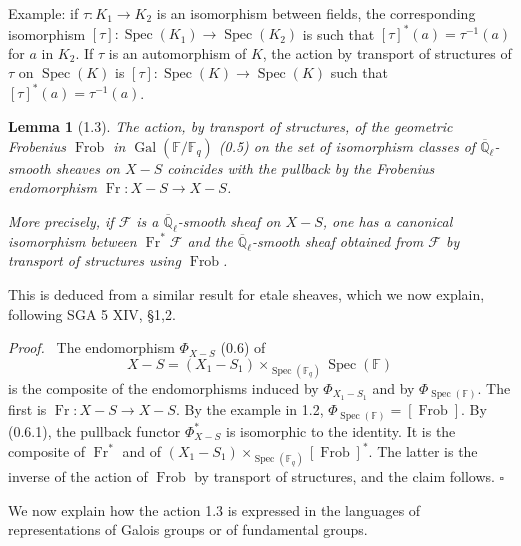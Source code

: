 \documentclass[10pt]{article}
\newcommand{\Fq}{\mathbb F_q}
\newcommand{\Fb}{\mathbb F}
\newcommand{\Ql}{\overline{\mathbb Q}_{\ell}}
\newcommand{\Gal}{\operatorname{Gal}}
\newcommand{\Spec}{\operatorname{Spec}}
\newcommand{\Fr}{\operatorname{Fr}}
\newcommand{\Frob}{\operatorname{Frob}}
\theoremstyle{deligne}
\newtheorem*{lemma*}{Lemma}
\newenvironment{proofdel}[1][Proof.]{\textit{#1}\ }{\hfill$\square$}
\newcommand{\heading}[1]{\vspace{0.7em}\noindent{\bfseries #1}\quad}
\begin{document}
Example: if $\tau:K_1\to K_2$ is an isomorphism between fields, the corresponding isomorphism $[\tau]:\Spec(K_1)\to\Spec(K_2)$ is such that $[\tau]^*(a)=\tau^{-1}(a)$ for $a$ in $K_2$. If $\tau$ is an automorphism of $K$, the action by transport of structures of $\tau$ on $\Spec(K)$ is $[\tau]:\Spec(K)\to\Spec(K)$ such that $[\tau]^*(a)=\tau^{-1}(a)$.

\begin{lemma*}[1.3]
The action, by transport of structures, of the geometric Frobenius $\Frob$ in $\Gal(\Fb/\Fq)$ (0.5) on the set of isomorphism classes of $\Ql$-smooth sheaves on $X-S$ coincides with the pullback by the Frobenius endomorphism $\Fr:X-S\to X-S$.

More precisely, if $\mathcal F$ is a $\Ql$-smooth sheaf on $X-S$, one has a canonical isomorphism between $\Fr^*\mathcal F$ and the $\Ql$-smooth sheaf obtained from $\mathcal F$ by transport of structures using $\Frob$.
\end{lemma*}

This is deduced from a similar result for etale sheaves, which we now explain, following SGA 5 XIV, \S1,2.

\begin{proofdel}
The endomorphism $\Phi_{X-S}$ (0.6) of
\[
 X-S=(X_1-S_1)\times_{\Spec(\Fq)}\Spec(\Fb)
\]
is the composite of the endomorphisms induced by $\Phi_{X_1-S_1}$ and by $\Phi_{\Spec(\Fb)}$. The first is $\Fr:X-S\to X-S$. By the example in 1.2, $\Phi_{\Spec(\Fb)}=[\Frob]$. By (0.6.1), the pullback functor $\Phi^*_{X-S}$ is isomorphic to the identity. It is the composite of $\Fr^*$ and of $(X_1-S_1)\times_{\Spec(\Fq)}[\Frob]^*$. The latter is the inverse of the action of $\Frob$ by transport of structures, and the claim follows.
\end{proofdel}

\heading{1.4.} We now explain how the action 1.3 is expressed in the languages of representations of Galois groups or of fundamental groups.
\end{document}

